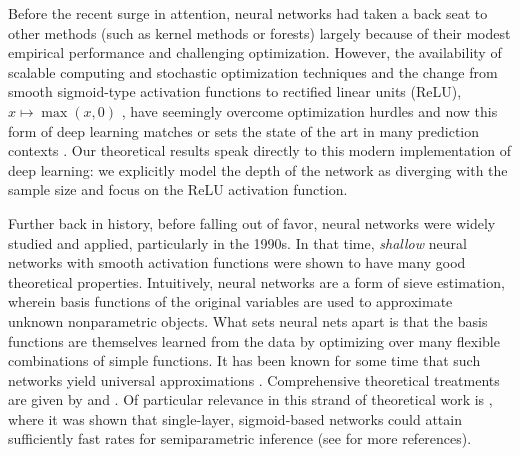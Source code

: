 \documentclass[11pt]{article}
\numberwithin{equation}{section}
\theoremstyle{definition}
\begin{document}
Before the recent surge in attention, neural networks had taken a back seat to other methods (such as kernel methods or forests) largely because of their modest empirical performance and challenging optimization. However, the availability of scalable computing and stochastic optimization techniques \citep{lecun1998gradient,kingma2014adam} and the change from smooth sigmoid-type activation functions to rectified linear units (ReLU), $x \mapsto \max(x,0)$ \citep{nair2010rectified}, have seemingly overcome optimization hurdles and now this form of deep learning matches or sets the state of the art in many prediction contexts \citep{krizhevsky2012imagenet, he2016identity}. Our theoretical results speak directly to this modern implementation of deep learning: we explicitly model the depth of the network as diverging with the sample size and focus on the ReLU activation function. 



Further back in history, before falling out of favor, neural networks were widely studied and applied, particularly in the 1990s. In that time, \emph{shallow} neural networks with smooth activation functions were shown to have many good theoretical properties. Intuitively, neural networks are a form of sieve estimation, wherein basis functions of the original variables are used to approximate unknown nonparametric objects. What sets neural nets apart is that the basis functions are themselves learned from the data by optimizing over many flexible combinations of simple functions. It has been known for some time that such networks yield universal approximations \citep{hornik1989multilayer}. Comprehensive theoretical treatments are given by \citet{white1992artificial} and \citet{Anthony-Bartlett1999_book}. Of particular relevance in this strand of theoretical work is \citet{Chen-White1999_IEEE}, where it was shown that single-layer, sigmoid-based networks could attain sufficiently fast rates for semiparametric inference (see \citet{Chen2007_handbook} for more references). 
\end{document}
